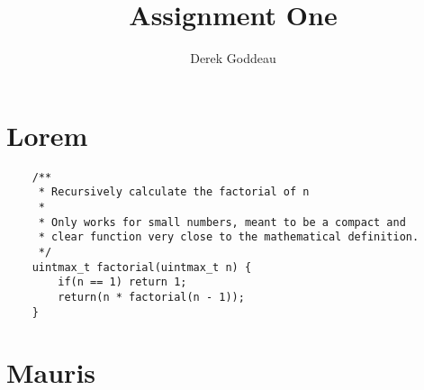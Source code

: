 \documentclass[12pt, a4paper]{article}
\author{Derek Goddeau}
\title{Assignment One}
\begin{document}
\maketitle

\newpage

\section{Lorem}
\lipsum[1-4]

\begin{minipage}{\linewidth} %
    \vspace{2em}
    \begin{verbatim}
    /**
     * Recursively calculate the factorial of n
     *
     * Only works for small numbers, meant to be a compact and
     * clear function very close to the mathematical definition.
     */
    uintmax_t factorial(uintmax_t n) {
        if(n == 1) return 1;
        return(n * factorial(n - 1));
    }
    \end{verbatim}
    \vspace{2em}
\end{minipage}

\lipsum[5-8]

\section{Mauris}
\lipsum[9-14]
\end{document}
